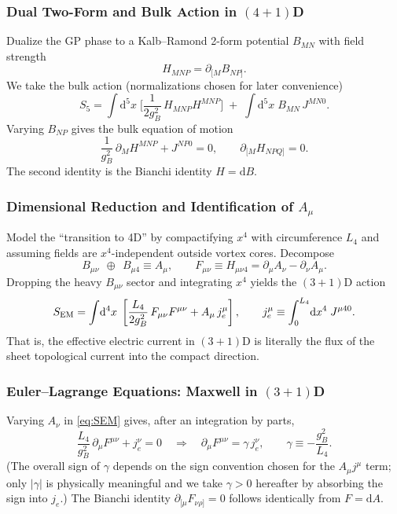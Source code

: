 \subsubsection{Dual Two-Form and Bulk Action in $(4{+}1)$D}
Dualize the GP phase to a Kalb--Ramond 2-form potential $B_{MN}$ with field strength
\begin{equation}
H_{MNP}=\partial_{[M}B_{NP]}.
\end{equation}
We take the bulk action (normalizations chosen for later convenience)
\begin{equation}
S_{5}=\int\! \mathrm d^{5}x\;\Big[\frac{1}{2g_B^2}\,H_{MNP}H^{MNP}\Big]\;+\;\int\!\mathrm d^{5}x\; B_{MN}\,J^{MN0}.
\label{eq:S5}
\end{equation}
Varying $B_{NP}$ gives the bulk equation of motion
\begin{equation}
\frac{1}{g_B^2}\,\partial_M H^{MNP}+J^{NP0}=0,
\qquad \partial_{[M}H_{NPQ]}=0.
\end{equation}
The second identity is the Bianchi identity $H=\mathrm dB$.

\subsubsection{Dimensional Reduction and Identification of $A_\mu$}
Model the ``transition to 4D'' by compactifying $x^4$ with circumference $L_4$ and assuming fields are $x^4$-independent outside vortex cores. Decompose
\begin{equation}
B_{\mu\nu}\ \ \oplus\ \ B_{\mu 4}\equiv A_\mu,
\qquad
F_{\mu\nu}\equiv H_{\mu\nu 4}=\partial_\mu A_\nu-\partial_\nu A_\mu.
\end{equation}
Dropping the heavy $B_{\mu\nu}$ sector and integrating $x^4$ yields the $(3{+}1)$D action
\begin{equation}
S_{\rm EM}=\int\!\mathrm d^{4}x\;\left[\frac{L_4}{2g_B^2}\,F_{\mu\nu}F^{\mu\nu}
+ A_\mu\, j_e^\mu\right],
\qquad
j_e^\mu \equiv \int_0^{L_4}\! \mathrm dx^4\;J^{\mu 4 0}.
\label{eq:SEM}
\end{equation}
That is, the effective electric current in $(3{+}1)$D is literally the flux of the sheet topological current into the compact direction.

\subsubsection{Euler--Lagrange Equations: Maxwell in $(3{+}1)$D}
Varying $A_\nu$ in \eqref{eq:SEM} gives, after an integration by parts,
\begin{equation}
\frac{L_4}{g_B^2}\,\partial_\mu F^{\mu\nu}+ j_e^\nu=0
\quad\Longrightarrow\quad
\partial_\mu F^{\mu\nu}=\gamma\, j_e^\nu,\qquad
\gamma\equiv -\frac{g_B^2}{L_4}.
\label{eq:maxwell-gamma}
\end{equation}
(The overall sign of $\gamma$ depends on the sign convention chosen for the $A_\mu j^\mu$ term; only $|\gamma|$ is physically meaningful and we take $\gamma>0$ hereafter by absorbing the sign into $j_e$.) The Bianchi identity $\partial_{[\mu}F_{\nu\rho]}=0$ follows identically from $F=\mathrm dA$.

